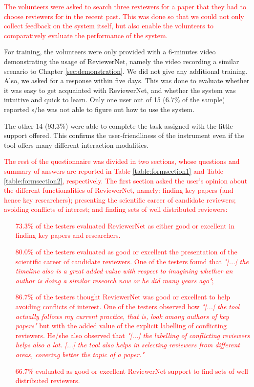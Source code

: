 \textcolor{red}{The volunteers were asked to search three reviewers for a paper that they had to choose reviewers for in the recent past. This was done so that we could not only collect feedback on the system itself, but also enable the volunteers to comparatively evaluate the performance of the system.}

For training, the volunteers were only provided with a 6-minutes video demonstrating the usage of ReviewerNet, namely the video recording a similar scenario to Chapter \ref{sec:demonstration}. We did not give any additional training. Also, we asked for a response within five days. This was done to evaluate whether it was easy to get acquainted with ReviewerNet, and whether the system was intuitive and quick to learn. Only one user out of 15 (6.7\% of the sample) reported s/he was not able to figure out how to use the system. 

The other 14 (93.3\%) were able to complete the task assigned with the little support offered. This confirms the user-friendliness of the instrument even if the tool offers many different interaction modalities.

\textcolor{red}{The rest of the questionnaire was divided in two sections, whose questions and summary of answers are reported in Table \ref{table:formsection1} and Table \ref{table:formsection2}, respectively. The first section asked the user's opinion about the different functionalities of ReviewerNet, namely: finding key papers (and hence key researchers); presenting the scientific career of candidate reviewers; avoiding conflicts of interest; and finding sets of well distributed reviewers:%
\begin{itemize}
\item [73.3\%] of the testers evaluated ReviewerNet as either good or excellent in finding key papers and researchers. 
\item [80.0\%] of the testers evaluated as good or excellent the presentation of the scientific career of candidate reviewers. One of the testers found that {\em "[...] the timeline also is a great added value with respect to imagining whether an author is doing a similar research now or he did many years ago"};
\item [ 86.7\%] of the testers thought ReviewerNet was good or excellent to help avoiding conflicts of interest. One of the testers observed how {\em "[...] the tool actually follows my current practice, that is, look among authors of key papers"} but with the added value of the explicit labelling of conflicting reviewers. He/she also observed that {\em "[...] the labelling of conflicting reviewers helps also a lot. [...] the tool also helps in selecting reviewers from different areas, covering better the topic of a paper."}
\item [ 66.7\%] evaluated as good or excellent ReviewerNet support to find sets of well distributed reviewers. 
\end{itemize}
}

